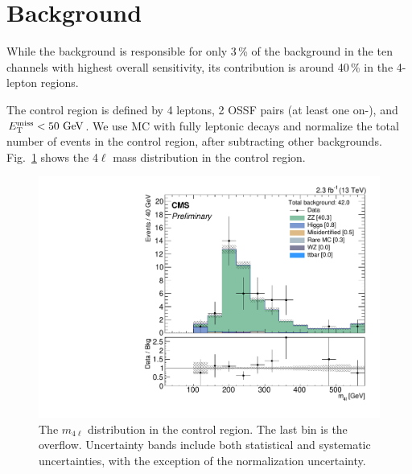 \section{\texorpdfstring{\ZZ}{ZZ} Background}
\label{sec:bkg_ZZ}

While the \ZZ background is responsible for only 3\,\% of the background in the ten channels with highest overall sensitivity, its contribution is around 40\,\% in the 4-lepton regions.

The control region is defined by 4 leptons, 2 OSSF pairs (at least one on-\Z), and $E_{\mathrm{T}}^{\text{miss}} < 50\,\,\text{Ge\hspace{-.08em}V}$. We use \ZZ MC with fully leptonic decays and normalize the total number of events in the control region, after subtracting other backgrounds. Fig.~\ref{fig:ZZ} shows the 4$\ell$ mass distribution in the control region.

\begin{figure}
\begin{center}
	\includegraphics[width=.7\textwidth]{Background/bkg_ZZ/ZZ_DYz2MET0to50HT0to200_MLIGHTLEPTONS}
	\caption{The $m_{4\ell}$ distribution in the \ZZ control region. The last bin is the overflow. Uncertainty bands include both statistical and systematic uncertainties, with the exception of the \ZZ normalization uncertainty.
	\label{fig:ZZ}}
\end{center}
\end{figure}
